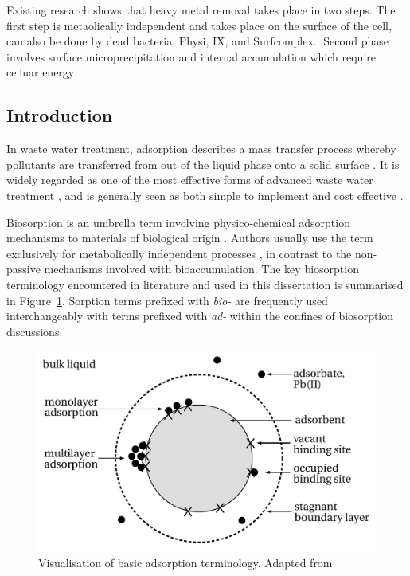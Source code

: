 \parencite{Qin2020} Existing research shows that heavy metal removal takes place in two steps. The first step is metaolically independent and takes place on the surface of the cell, can also be done by dead bacteria. Physi, IX, and Surfcomplex.. Second phase involves surface microprecipitation and internal accumulation which require celluar energy

\subsection{Introduction}

In waste water treatment, adsorption describes a mass transfer process whereby pollutants are transferred from out of the liquid phase onto a solid surface \parencite{Wang2020}. It is widely regarded as one of the most effective forms of advanced waste water treatment \parencite{KumarReddy2012}, and is generally seen as both simple to implement and cost effective \parencite{Fomina2014}. 

Biosorption is an umbrella term involving physico-chemical adsorption mechanisms to materials of biological origin \parencite{Robalds2016}. Authors usually use the term exclusively for metabolically independent processes \parencite{Fomina2014}, in contrast to the non-passive mechanisms involved with bioaccumulation. The key biosorption terminology encountered in literature and used in this dissertation is summarised in Figure~\ref{fig:terminology}. Sorption terms prefixed with \textit{bio-} are frequently used interchangeably with terms prefixed with \textit{ad-} within the confines of biosorption discussions.

\begin{figure}[tbph!]
	\centering
	\includegraphics[width=0.8\linewidth]{Theory/Pics/terminology}
	\caption{Visualisation of basic adsorption terminology. Adapted from \textcite{Tran2017}}
	\label{fig:terminology}
\end{figure}


